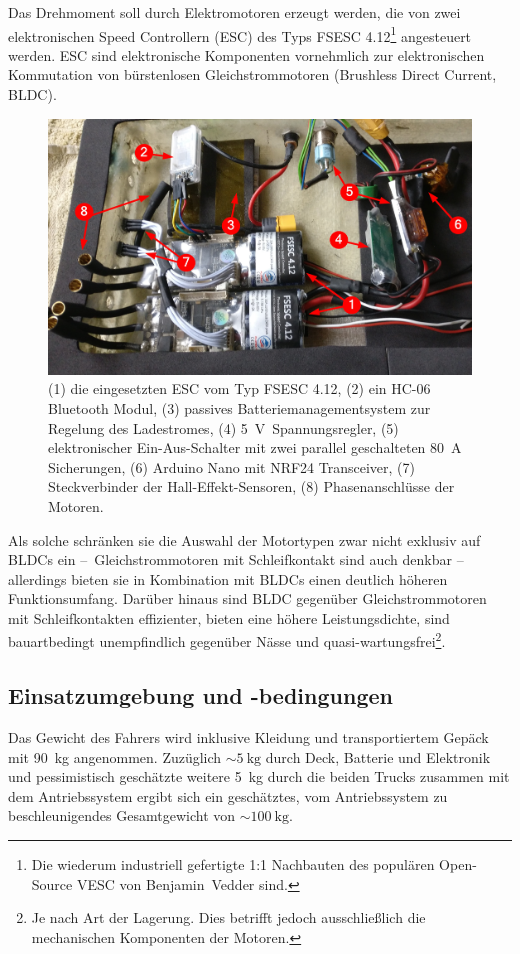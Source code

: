			Das Drehmoment soll durch Elektromotoren erzeugt werden, die von zwei elektronischen Speed Controllern (ESC) des Typs \textsc{FSESC 4.12}\footnote{\hspace{1mm} Die wiederum industriell gefertigte 1:1 Nachbauten des populären Open-Source \textsc{VESC} von Benjamin~Vedder sind.} angesteuert werden.
			ESC sind elektronische Komponenten vornehmlich zur elektronischen Kommutation von bürstenlosen Gleichstrommotoren (Brushless Direct Current, BLDC).
			\begin{figure}[h]
				\centering
				\includegraphics[width=.9\textwidth]{Footage/Pictures/Electronics.jpg}
				\caption[Eingesetzte ESC]{(1) die eingesetzten ESC vom Typ \textsc{FSESC 4.12}, (2) ein HC-06 Bluetooth Modul, (3) passives Batteriemanagementsystem zur Regelung des Ladestromes, (4) \qty{5}{\volt}~Spannungsregler, (5) elektronischer Ein-Aus-Schalter mit zwei parallel geschalteten \qty{80}{\ampere} Sicherungen, (6) Arduino Nano mit NRF24 Transceiver, (7) Steckverbinder der Hall-Effekt-Sensoren, (8) Phasenanschlüsse der Motoren.}\label{fig:electronics}
			\end{figure}
			Als solche schränken sie die Auswahl der Motortypen zwar nicht exklusiv auf BLDCs ein --~Gleichstrommotoren mit Schleifkontakt sind auch denkbar -- allerdings bieten sie in Kombination mit BLDCs einen deutlich höheren Funktionsumfang.
			Darüber hinaus sind BLDC gegenüber Gleichstrommotoren mit Schleifkontakten effizienter, bieten eine höhere Leistungsdichte, sind bauartbedingt unempfindlich gegenüber Nässe und quasi-wartungsfrei\footnote{\hspace{1mm} Je nach Art der Lagerung. Dies betrifft jedoch ausschließlich die mechanischen Komponenten der Motoren.}.
		\subsection{Einsatzumgebung und -bedingungen}
			Das Gewicht des Fahrers wird inklusive Kleidung und transportiertem Gepäck mit \qty{90}{\kilo\gram} angenommen.
			Zuzüglich \(\sim \qty{5}{\kilo\gram}\) durch Deck, Batterie und Elektronik und pessimistisch geschätzte weitere \qty{5}{\kilo\gram} durch die beiden Trucks zusammen mit dem Antriebssystem ergibt sich ein geschätztes, vom Antriebssystem zu beschleunigendes Gesamtgewicht von \(\sim \qty{100}{\kilo\gram}\).

